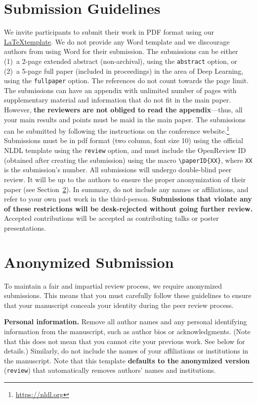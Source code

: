 \documentclass[fullpaper]{nldl}
\begin{document}
\section{Submission Guidelines}
We invite participants to submit their work in PDF format using our \href{https://github.com/SFI-Visual-Intelligence/nldl}{\LaTeX template}.
We do not provide any Word template and we discourage authors from using Word for their submission.
The submissions can be either (1)~a 2-page extended abstract (non-archival), using the \verb|abstract| option, or (2)~a 5-page full paper (included in proceedings) in the area of Deep Learning, using the \verb|fullpaper| option.
The references do not count towards the page limit.
The submissions can have an appendix with unlimited number of pages with supplementary material and information that do not fit in the main paper.
However, \textbf{the reviewers are not obliged to read the appendix}---thus, all your main results and points must be maid in the main paper.
The submissions can be submitted by following the instructions on the conference website.\footnote{\url{https://nldl.org}}
Submissions must be in pdf format (two column, font size 10) using the official NLDL template using the \verb|review| option, and must include the OpenReview ID (obtained after creating the submission) using the macro \verb|\paperID{XX}|, where \verb|XX| is the submission's number.
All submissions will undergo double-blind peer review.
It will be up to the authors to ensure the proper anonymization of their paper (see Section~\ref{sec:anon}).
In summary, do not include any names or affiliations, and refer to your own past work in the third-person.
\textbf{Submissions that violate any of these restrictions will be desk-rejected without going further review.}
Accepted contributions will be accepted as contributing talks or poster presentations.

\section{Anonymized Submission}
\label{sec:anon}

To maintain a fair and impartial review process, we require anonymized submissions.
This means that you must carefully follow these guidelines to ensure that your manuscript conceals your identity during the peer review process.

\textbf{Personal information.}
Remove all author names and any personal identifying information from the manuscript, such as author bios or acknowledgments.
(Note that this does not mean that you cannot cite your previous work.
See below for details.)
Similarly, do not include the names of your affiliations or institutions in the manuscript.
Note that this template \textbf{defaults to the anonymized version} (\verb|review|) that automatically removes authors' names and institutions.
\end{document}
